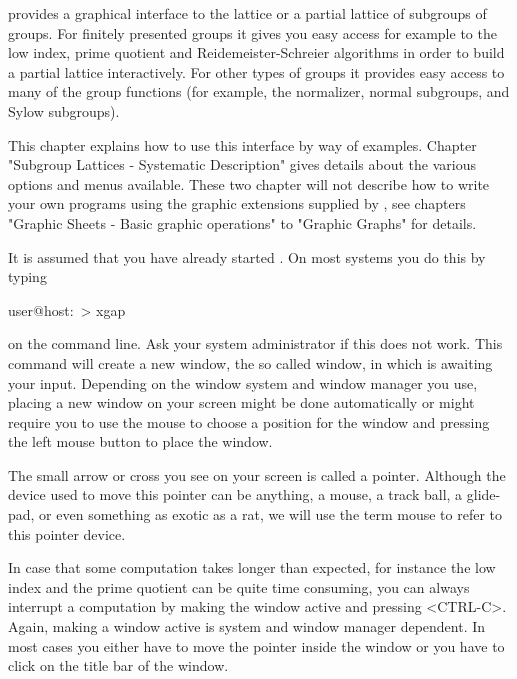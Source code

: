 
{\XGAP} provides a graphical interface to the  lattice or a partial lattice
of subgroups of groups.  For finitely  presented groups it gives you easy
access for example to the low index, prime quotient and Reidemeister-Schreier
algorithms in order to build a partial  lattice interactively.  For other
types of groups  it provides easy access to  many of  the group functions
(for example, the normalizer, normal subgroups, and Sylow subgroups).

This chapter explains  how to use this  interface by way of examples.  
Chapter  "Subgroup  Lattices - Systematic  Description" gives
details about the   various  options and menus available.    These two
chapter  will not  describe how to  write  your own programs using the
graphic extensions supplied by {\XGAP}, see chapters "Graphic Sheets -
Basic graphic operations" to "Graphic Graphs" for details.

It is assumed that you have already started {\XGAP}.  On most systems you
do this by typing

\begintt 
user@host:~> xgap 
\endtt

on  the  command line.   Ask your  system administrator  if this does not
work.  This   command  will create   a new window,   the so called {\GAP}
window, in which {\GAP} is awaiting your input.   Depending on the window
system and window manager  you use, placing a new  window on your  screen
might be  done  automatically or might  require  you to use the  mouse to
choose a position for the  window and pressing the  left mouse button  to
place the window.

The small arrow   or cross you see on   your screen is  called a pointer.
Although the device used to move this pointer can be anything, a mouse, a
track ball, a glide-pad, or even something as exotic as a rat, we will use
the term mouse to refer to this pointer device.

In case that some computation takes longer than expected, for instance
the low index and the prime quotient can  be quite time consuming, you
can always interrupt a computation by  making the {\GAP} window active
and pressing <CTRL-C>.   Again, making a window  active is  system and
window manager  dependent.  In most cases  you either have to move the
pointer inside the {\GAP} window or you have to click on the title bar
of the {\GAP} window.



